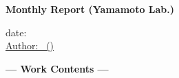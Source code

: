 \documentclass[11pt, a4paper, twoside]{YReport_en}
\begin{document}
\thispagestyle{yrstylef}
\begin{center}
\Huge
{\bf Monthly Report (Yamamoto Lab.)}
\end{center}
%
\begin{flushright}
\vspace{5truemm}
\large
date: \YRdate \\
\underline{%
Author: \YRname \ (\YRgrade)
}
\\[4truemm]
\normalsize
\end{flushright}
%
\YRplan

\vspace{3.2truemm}
\begin{center}
{\large \bf --- Work Contents ---}
\vspace{-6truemm}
\end{center}
\hrulefill

\setlength{\baselineskip}{16truept}
\YRachievement

\newpage


\end{document}
